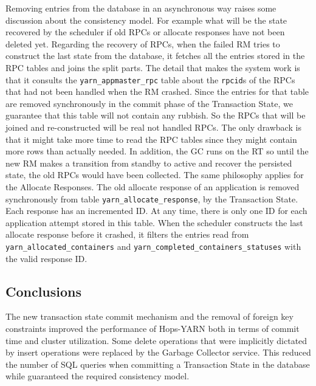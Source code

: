Removing entries from the database in an asynchronous way raises some
discussion about the consistency model. For example what will be the
state recovered by the scheduler if old RPCs or allocate responses
have not been deleted yet. Regarding the recovery of RPCs, when the
failed RM tries to construct the last state from the database, it
fetches all the entries stored in the RPC tables and joins the split
parts. The detail that makes the system work is that it consults the
\texttt{yarn\_appmaster\_rpc} table about the \texttt{rpcid}s of the
RPCs that had not been handled when the RM crashed. Since the entries
for that table are removed synchronously in the commit phase of the
Transaction State, we guarantee that this table will not contain any
rubbish. So the RPCs that will be joined and re-constructed will be
real not handled RPCs. The only drawback is that it might take more
time to read the RPC tables since they might contain more rows than
actually needed. In addition, the GC runs on the RT so until the new
RM makes a transition from standby to active and recover the persisted
state, the old RPCs would have been collected. The same philosophy
applies for the Allocate Responses. The old allocate response of an
application is removed synchronously from table
\texttt{yarn\_allocate\_response}, by the Transaction State. Each
response has an incremented ID. At any time, there is only one ID for
each application attempt stored in this table. When the scheduler
constructs the last allocate response before it crashed, it filters
the entries read from \texttt{yarn\_allocated\_containers} and
\texttt{yarn\_completed\_containers\_statuses} with the valid response
ID.

\subsection{Conclusions}
\label{ssec:impl_gc_service_conclusions}
The new transaction state commit mechanism and the removal of foreign
key constraints improved the performance of Hops-YARN both in terms of
commit time and cluster utilization. Some delete operations that were
implicitly dictated by insert operations were replaced by the Garbage
Collector service. This reduced the number of SQL queries when committing a
Transaction State in the database while guaranteed the required
consistency model.